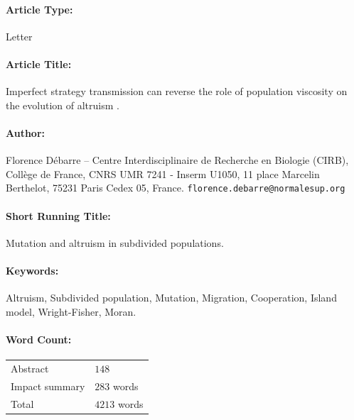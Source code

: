 \documentclass[11pt, letterpaper]{article}
\begin{document}
\pagestyle{maintext}


\paragraph{Article Type:} Letter

\paragraph{Article Title:} Imperfect strategy transmission can reverse the role of population viscosity on the evolution of altruism .

\paragraph{Author:} Florence D\'ebarre -- Centre Interdisciplinaire de Recherche en Biologie (CIRB), Coll\`ege de France, CNRS UMR 7241 - Inserm U1050, 11 place Marcelin Berthelot, 75231 Paris Cedex 05, France. \texttt{florence.debarre@normalesup.org}

\paragraph{Short Running Title:} Mutation and altruism in subdivided populations.

\paragraph{Keywords:} Altruism, Subdivided population, Mutation, Migration, Cooperation, Island model, Wright-Fisher, Moran.

\paragraph{Word Count:}
\begin{tabular}[t]{ll}
Abstract & $148$ \\
Impact summary & $283$ words \\
Total & $4213$ words
\end{tabular}


\end{document}
